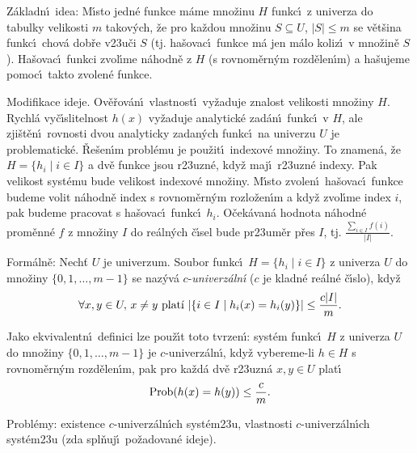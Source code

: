 \documentclass[a4paper,12pt]{article}
\begin{document}
\flushpar Z\'akladn\'\i\ idea: M\'\i sto jedn\'e funkce m\'ame 
mno\v zinu $H$ funkc\'\i\ z univerza do tabulky velikosti $m$ 
takov\'ych, \v ze pro ka\v zdou mno\v zinu $S\subseteq U$, $|S|\le 
m$ se 
v\v et\v sina funkc\'\i\ chov\'a dob\v re v\accent23u\v ci $S$ (tj. ha\v sovac\'\i\ funkce m\'a jen m\'alo koliz\'\i\ v mno\v zin\v e $S$). 
Ha\v sovac\'\i\ funkci 
zvol\'\i me n\'ahodn\v e z $H$ (s rovnom\v ern\'ym rozd\v elen\'\i m) a ha\v sujeme  
pomoc\'\i\ takto zvo\-len\'e funkce. 
\medskip

\flushpar Modifikace ideje. Ov\v e\v rov\'an\'\i\ vlastnost\'\i\ vy\v zaduje 
znalost velikosti mno\v ziny $H$. Rychl\'a vy\v c\'\i slitelnost $
h(x)$ 
vy\v zaduje ana\-lytick\'e zad\'an\'\i\ funkc\'\i\ v $H$, ale zji\v st\v en\'\i\ rovnosti 
dvou analy\-ticky zadan\'ych funkc\'\i\ na univerzu $U$ je 
problematick\'e. \v Re\v sen\'\i m probl\'emu je pou\v zit\'\i\ indexov\'e mno\v ziny. 
To znamen\'a, \v ze $H=\{h_i\mid i\in I\}$ a dv\v e funkce jsou r\accent23uzn\'e, 
kdy\v z maj\'\i\ r\accent23uzn\'e indexy. Pak velikost syst\'emu bude 
velikost indexov\'e mno\v ziny. M\'\i sto zvolen\'\i\ ha\v sovac\'\i\ funkce 
budeme volit n\'ahodn\v e index s rovnom\v ern\'ym rozlo\v zen\'\i m a kdy\v z 
zvol\'\i me index $i$, pak budeme pracovat s ha\v sovac\'\i\ funkc\'\i\ $
h_i$. 
O\v cek\'avan\'a hodnota n\'ahodn\'e prom\v enn\'e $f$ z mno\v ziny $
I$ do 
re\'aln\'ych \v c\'\i sel bude pr\accent23um\v er p\v res $I$, tj. $\frac {
\sum_{i\in I}f(i)}{|I|}$.

\flushpar Form\'aln\v e: Nech\v t  $U$ je univerzum. Soubor  
funkc\'\i\ $H=\{h_i\mid i\in I\}$ z univerza $U$ do mno\v ziny $\{
0,1,\dots,m-1\}$ se 
naz\'yv\'a $c$-\emph{univerz\'aln\'\i} ($c$ je kladn\'e re\'aln\'e \v c\'\i slo), 
kdy\v z 
$$\forall x,y\in U,\,x\ne y\text{\rm\ plat\'\i\ }|\{i\in I\mid h_
i(x)=h_i(y)\}|\le\frac {c|I|}m.$$
\medskip

\flushpar Jako ekvivalentn\'\i\ definici lze pou\v z\'\i t toto tvrzen\'\i : syst\'em funkc\'\i\ $
H$ z univerza $U$ do mno\v ziny $\{0,1,\dots,m-1\}$ je $c$-univerz\'aln\'\i ,
kdy\v z vybereme-li $h\in H$ s rovnom\v ern\'ym rozd\v ele\-n\'\i m, pak pro 
ka\v zd\'a dv\v e r\accent23uzn\'a $x,y\in U$ plat\'\i\ 
$$\operatorname{Prob}(h(x)=h(y))\le\frac cm.$$


\flushpar Probl\'emy: existence $c$-univerz\'aln\'\i ch 
syst\'em\accent23u, \newline 
vlastnosti $c$-univerz\'aln\'\i ch syst\'em\accent23u (zda spl\v nuj\'\i\ 
po\v zadovan\'e ide\-je).
\medskip
\end{document}
